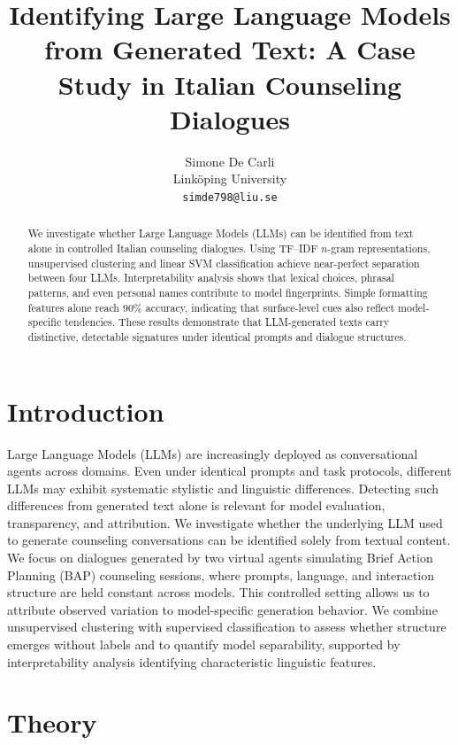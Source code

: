 \documentclass[11pt]{article}
\title{Identifying Large Language Models from Generated Text: A Case Study in Italian Counseling Dialogues}
\author{Simone De Carli \\
  Link\"oping University \\
  \texttt{simde798@liu.se}
}
\begin{document}
\maketitle

\begin{abstract}
  We investigate whether Large Language Models (LLMs) can be identified from text alone in controlled Italian counseling dialogues. Using TF--IDF $n$-gram representations, unsupervised clustering and linear SVM classification achieve near-perfect separation between four LLMs. Interpretability analysis shows that lexical choices, phrasal patterns, and even personal names contribute to model fingerprints. Simple formatting features alone reach 90\% accuracy, indicating that surface-level cues also reflect model-specific tendencies. These results demonstrate that LLM-generated texts carry distinctive, detectable signatures under identical prompts and dialogue structures.
\end{abstract}

\section{Introduction}

Large Language Models (LLMs) are increasingly deployed as conversational agents across domains. Even under identical prompts and task protocols, different LLMs may exhibit systematic stylistic and linguistic differences. Detecting such differences from generated text alone is relevant for model evaluation, transparency, and attribution.
We investigate whether the underlying LLM used to generate counseling conversations can be identified solely from textual content. We focus on dialogues generated by two virtual agents simulating Brief Action Planning (BAP) counseling sessions, where prompts, language, and interaction structure are held constant across models. This controlled setting allows us to attribute observed variation to model-specific generation behavior.
We combine unsupervised clustering with supervised classification to assess whether structure emerges without labels and to quantify model separability, supported by interpretability analysis identifying characteristic linguistic features.

\section{Theory}
\end{document}
